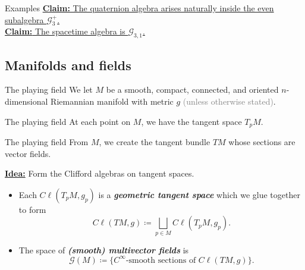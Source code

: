 \documentclass[aspectratio=169,handout]{beamer}
\newcommand\boldgreen[1]{\textcolor{lighter_csu_green}{\emph{\textbf{#1}}}}
\newcommand{\G}{\mathcal{G}}
\begin{document}
\begin{frame}{Examples}
\vfill
\underline{\textbf{Claim:} The quaternion algebra arises naturally inside the even subalgebra $\G_3^+$.}\\
\vspace*{0.5cm}
\underline{\textbf{Claim:} The spacetime algebra is $\G_{3,1}$.}\\
\vfill
\end{frame}



\subsection{Manifolds and fields}

\begin{frame}{The playing field}
\vfill
\pause
We let $M$ be a smooth, compact, connected, and oriented $n$-dimensional Riemannian manifold with metric $g$ \textcolor{gray}{(unless otherwise stated)}.
\begin{figure}[H]
	\centering
	\def\svgwidth{.6\columnwidth}
	
\end{figure}
\vfill
\end{frame}

\begin{frame}{The playing field}
\vfill
At each point on $M$, we have the tangent space $T_pM$.
\begin{figure}[H]
	\centering
	\def\svgwidth{.6\columnwidth}
	
\end{figure}
\vfill    
\end{frame}

\begin{frame}{The playing field}
\vfill
From $M$, we create the tangent bundle $TM$ whose sections are vector fields.
\begin{figure}[H]
	\centering
	\def\svgwidth{.6\columnwidth}
	
\end{figure}
\vfill
\end{frame}

\begin{frame}{}
\vfill
    \textbf{\underline{Idea:}} Form the Clifford algebras on tangent spaces.
    \pause
    \begin{itemize}
        \item Each $C\ell(T_pM,g_p)$ is a \boldgreen{geometric tangent space} which we glue together to form
        \[
        C\ell(TM,g) \coloneqq \bigsqcup_{p\in M} C\ell(T_pM,g_p).
        \]
    
        \item The space of \boldgreen{(smooth) multivector fields} is
        \[
        \G(M) \coloneqq \{\textrm{$C^\infty$-smooth sections of $C\ell(TM,g)$}\}.
        \]
    \end{itemize}
\vfill
\end{frame}
\end{document}
